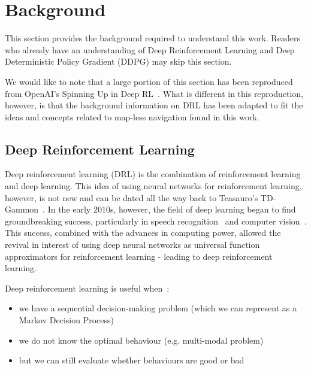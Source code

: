 
\chapter{Background}
\label{ch:background}
\vspace{2em}
This section provides the background required to understand this work. Readers who already have an understanding of Deep Reinforcement Learning and Deep Deterministic Policy Gradient (DDPG) may skip this section.

We would like to note that a large portion of this section has been reproduced from OpenAI's Spinning Up in Deep RL~\cite{SpinningUp2018}. What is different in this reproduction, however, is that the background information on DRL has been adapted to fit the ideas and concepts related to map-less navigation found in this work.

\section{Deep Reinforcement Learning}
Deep reinforcement learning (DRL) is the combination of reinforcement learning and deep learning. This idea of using neural networks for reinforcement learning, however, is not new and can be dated all the way back to Teasauro's TD-Gammon~\cite{tesauro_temporal_nodate}. In the early 2010s, however, the field of deep learning began to find groundbreaking success, particularly in speech recognition~\cite{dahl_context-dependent_2012} and computer vision~\cite{krizhevsky_imagenet_2017}. This success, combined with the advances in computing power, allowed the revival in interest of using deep neural networks as universal function approximators for reinforcement learning - leading to deep reinforcement learning.

Deep reinforcement learning is useful when~\cite{SpinningUp2018}:
\begin{itemize}
\item we have a sequential decision-making problem (which we can represent as a Markov Decision Process)
\item we do not know the optimal behaviour (e.g. multi-modal problem)
\item but we can still evaluate whether behaviours are good or bad
\end{itemize}

